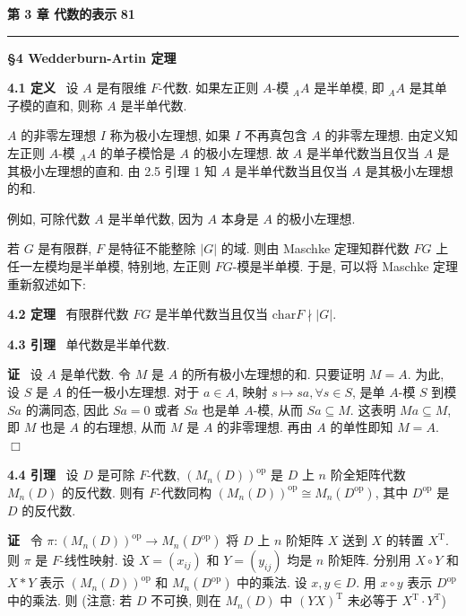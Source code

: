 \documentclass[11pt,a4paper]{article}
\begin{document}
\noindent \textbf{第 3 章 \quad 代数的表示} \hfill \textbf{81}
\vspace{0.5em} \hrule \vspace{1.5em}

\begin{center}
    \Large \textbf{\S 4 \quad Wedderburn-Artin 定理}
\end{center}

\vspace{1em}

\textbf{4.1 定义} \ 设 $A$ 是有限维 $F$-代数. 如果左正则 $A$-模 ${}_A A$ 是半单模, 即 ${}_A A$ 是其单子模的直和, 则称 $A$ 是半单代数.

$A$ 的非零左理想 $I$ 称为极小左理想, 如果 $I$ 不再真包含 $A$ 的非零左理想. 由定义知左正则 $A$-模 ${}_A A$ 的单子模恰是 $A$ 的极小左理想. 故 $A$ 是半单代数当且仅当 $A$ 是其极小左理想的直和. 由 2.5 引理 1 知 $A$ 是半单代数当且仅当 $A$ 是其极小左理想的和.

例如, 可除代数 $A$ 是半单代数, 因为 $A$ 本身是 $A$ 的极小左理想.

若 $G$ 是有限群, $F$ 是特征不能整除 $|G|$ 的域. 则由 Maschke 定理知群代数 $FG$ 上任一左模均是半单模, 特别地, 左正则 $FG$-模是半单模. 于是, 可以将 Maschke 定理重新叙述如下:

\vspace{0.5em}
\textbf{4.2 定理} \ 有限群代数 $FG$ 是半单代数当且仅当 $\mathrm{char}F \nmid |G|$.
\vspace{0.5em}

\textbf{4.3 引理} \ 单代数是半单代数.

\textbf{证} \ 设 $A$ 是单代数. 令 $M$ 是 $A$ 的所有极小左理想的和. 只要证明 $M = A$. 为此, 设 $S$ 是 $A$ 的任一极小左理想. 对于 $a \in A$, 映射 $s \mapsto sa, \forall s \in S$, 是单 $A$-模 $S$ 到模 $Sa$ 的满同态, 因此 $Sa = 0$ 或者 $Sa$ 也是单 $A$-模, 从而 $Sa \subseteq M$. 这表明 $Ma \subseteq M$, 即 $M$ 也是 $A$ 的右理想, 从而 $M$ 是 $A$ 的非零理想. 再由 $A$ 的单性即知 $M = A$. \hfill $\Box$
\vspace{0.5em}

\textbf{4.4 引理} \ 设 $D$ 是可除 $F$-代数, $(M_n(D))^{\mathrm{op}}$ 是 $D$ 上 $n$ 阶全矩阵代数 $M_n(D)$ 的反代数. 则有 $F$-代数同构 $(M_n(D))^{\mathrm{op}} \cong M_n(D^{\mathrm{op}})$, 其中 $D^{\mathrm{op}}$ 是 $D$ 的反代数.

\textbf{证} \ 令 $\pi : (M_n(D))^{\mathrm{op}} \to M_n(D^{\mathrm{op}})$ 将 $D$ 上 $n$ 阶矩阵 $X$ 送到 $X$ 的转置 $X^{\mathrm{T}}$. 则 $\pi$ 是 $F$-线性映射. 设 $X=(x_{ij})$ 和 $Y=(y_{ij})$ 均是 $n$ 阶矩阵. 分别用 $X \circ Y$ 和 $X * Y$ 表示 $(M_n(D))^{\mathrm{op}}$ 和 $M_n(D^{\mathrm{op}})$ 中的乘法. 设 $x, y \in D$. 用 $x \circ y$ 表示 $D^{\mathrm{op}}$ 中的乘法. 则 (注意: 若 $D$ 不可换, 则在 $M_n(D)$ 中 $(YX)^{\mathrm{T}}$ 未必等于 $X^{\mathrm{T}} \cdot Y^{\mathrm{T}}$)
\end{document}
